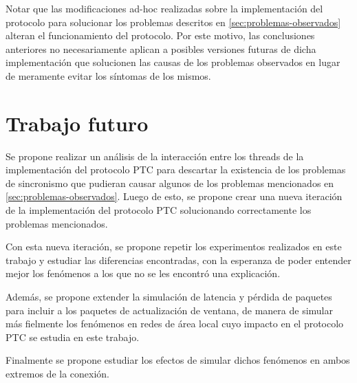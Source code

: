 \documentclass[a4paper, 10pt, twoside]{article}
\begin{document}
Notar que las modificaciones ad-hoc realizadas sobre la implementación del protocolo para solucionar los problemas descritos en \ref{sec:problemas-observados} alteran el funcionamiento del protocolo. Por este motivo, las conclusiones anteriores no necesariamente aplican a posibles versiones futuras de dicha implementación que solucionen las causas de los problemas observados en lugar de meramente evitar los síntomas de los mismos.




\section{Trabajo futuro}

Se propone realizar un análisis de la interacción entre los threads de la implementación del protocolo PTC para descartar la existencia de los problemas de sincronismo que pudieran causar algunos de los problemas mencionados en \ref{sec:problemas-observados}. Luego de esto, se propone crear una nueva iteración de la implementación del protocolo PTC solucionando correctamente los problemas mencionados.

Con esta nueva iteración, se propone repetir los experimentos realizados en este trabajo y estudiar las diferencias encontradas, con la esperanza de poder entender mejor los fenómenos a los que no se les encontró una explicación.

Además, se propone extender la simulación de latencia y pérdida de paquetes para incluir a los paquetes de actualización de ventana, de manera de simular más fielmente los fenómenos en redes de área local cuyo impacto en el protocolo PTC se estudia en este trabajo.

Finalmente se propone estudiar los efectos de simular dichos fenómenos en ambos extremos de la conexión.
\end{document}
